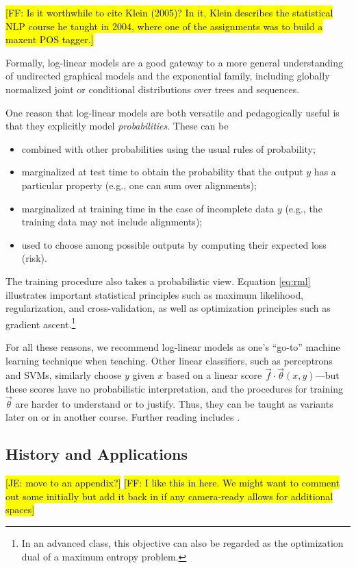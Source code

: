 \documentclass[11pt,letterpaper]{article}
\newcommand{\Note}[1]{}
\renewcommand{\Note}[1]{\hl{[#1]}}
\newcommand{\NoteSigned}[3]{{\sethlcolor{#2}\Note{#1: #3}}}
\newcommand{\NoteFF}[1]{\NoteSigned{FF}{LightBlue}{#1}}
\newcommand{\NoteJE}[1]{\NoteSigned{JE}{LightGreen}{#1}}
\begin{document}
\nocite{klein-tnlp-2005}\NoteFF{Is it worthwhile to cite Klein (2005)? In it,
Klein describes the statistical NLP course he taught in 2004, where
one of the assignments was to build a maxent POS tagger.}

Formally, log-linear models are a good gateway to a more general
understanding of undirected graphical models and the exponential
family, including globally normalized joint or conditional
distributions over trees and sequences.

One reason that log-linear models are both versatile and pedagogically
useful is that they explicitly model {\em probabilities}.  These can be 
\begin{itemize}
\item combined with other probabilities using the usual rules of probability;
\item marginalized at test time to obtain the probability that the output 
  $y$ has a particular property (e.g., one can sum over alignments);
\item marginalized at training time in the case of incomplete data $y$
  (e.g., the training data may not include alignments);
\item used to choose among possible outputs by computing their 
  expected loss (risk).
\end{itemize}
The training procedure also takes a probabilistic view.  Equation
\eqref{eq:rml} illustrates important statistical principles such as maximum
likelihood, regularization, and cross-validation, as well as
optimization principles such as gradient ascent.\footnote{In an
  advanced class, this objective can also be regarded as the
  optimization dual of a maximum entropy problem.}

For all these reasons, we recommend log-linear models as one's
``go-to'' machine learning technique when teaching.  Other linear
classifiers, such as perceptrons and SVMs, similarly choose $y$ given
$x$ based on a linear score $\vec{f} \cdot \vec{\theta}(x,y)$---but
these scores have no probabilistic interpretation, and the procedures
for training $\vec{\theta}$ are harder to understand or to justify.
Thus, they can be taught as variants later on or in another course.
Further reading includes \cite{smith-2011}.

\subsection{History and Applications}

\NoteJE{move to an appendix?}
\NoteFF{I like this in here. We might want to comment out some initially
but add it back in if any camera-ready allows for additional spaces}
\end{document}
